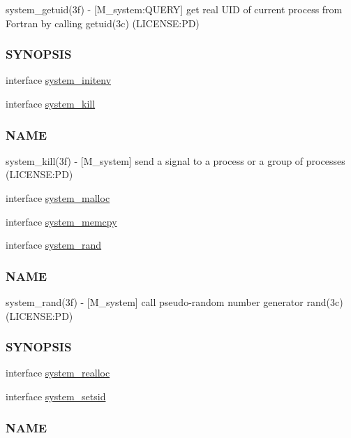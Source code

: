 \begin{DoxyCompactItemize}
\begin{DoxyCompactList}
system\+\_\+getuid(3f) -\/ \mbox{[}M\+\_\+system\+:Q\+U\+E\+RY\mbox{]} get real U\+ID of current process from Fortran by calling getuid(3c) (L\+I\+C\+E\+N\+SE\+:PD) \subsubsection*{S\+Y\+N\+O\+P\+S\+IS}\end{DoxyCompactList}\item 
interface \mbox{\hyperlink{interfacem__system_1_1system__initenv}{system\+\_\+initenv}}
\item 
interface \mbox{\hyperlink{interfacem__system_1_1system__kill}{system\+\_\+kill}}
\begin{DoxyCompactList}\small\item\em \subsubsection*{N\+A\+ME}

system\+\_\+kill(3f) -\/ \mbox{[}M\+\_\+system\mbox{]} send a signal to a process or a group of processes (L\+I\+C\+E\+N\+SE\+:PD) \end{DoxyCompactList}\item 
interface \mbox{\hyperlink{interfacem__system_1_1system__malloc}{system\+\_\+malloc}}
\item 
interface \mbox{\hyperlink{interfacem__system_1_1system__memcpy}{system\+\_\+memcpy}}
\item 
interface \mbox{\hyperlink{interfacem__system_1_1system__rand}{system\+\_\+rand}}
\begin{DoxyCompactList}\small\item\em \subsubsection*{N\+A\+ME}

system\+\_\+rand(3f) -\/ \mbox{[}M\+\_\+system\mbox{]} call pseudo-\/random number generator rand(3c) (L\+I\+C\+E\+N\+SE\+:PD) \subsubsection*{S\+Y\+N\+O\+P\+S\+IS}\end{DoxyCompactList}\item 
interface \mbox{\hyperlink{interfacem__system_1_1system__realloc}{system\+\_\+realloc}}
\item 
interface \mbox{\hyperlink{interfacem__system_1_1system__setsid}{system\+\_\+setsid}}
\begin{DoxyCompactList}\small\item\em \subsubsection*{N\+A\+ME}


\end{DoxyCompactList}
\end{DoxyCompactItemize}
